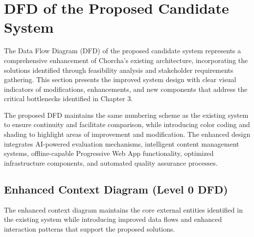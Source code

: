 \documentclass[12pt,a4paper,oneside]{book}
\begin{document}
\section{DFD of the Proposed Candidate System}

The Data Flow Diagram (DFD) of the proposed candidate system represents a comprehensive enhancement of Chorcha's existing architecture, incorporating the solutions identified through feasibility analysis and stakeholder requirements gathering. This section presents the improved system design with clear visual indicators of modifications, enhancements, and new components that address the critical bottlenecks identified in Chapter 3.

The proposed DFD maintains the same numbering scheme as the existing system to ensure continuity and facilitate comparison, while introducing color coding and shading to highlight areas of improvement and modification. The enhanced design integrates AI-powered evaluation mechanisms, intelligent content management systems, offline-capable Progressive Web App functionality, optimized infrastructure components, and automated quality assurance processes.

\subsection{Enhanced Context Diagram (Level 0 DFD)}

The enhanced context diagram maintains the core external entities identified in the existing system while introducing improved data flows and enhanced interaction patterns that support the proposed solutions.
\end{document}
